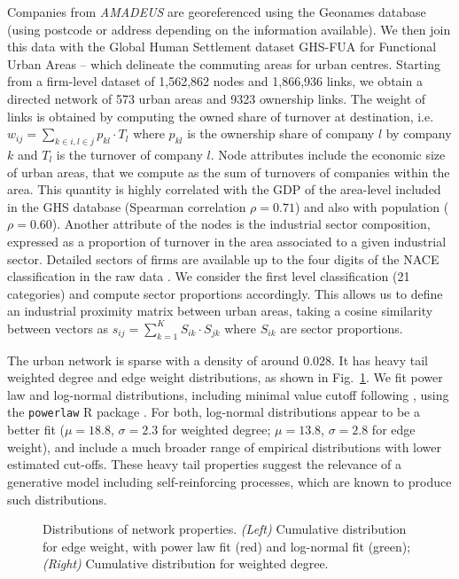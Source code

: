 \documentclass[10pt,letterpaper]{article}
\begin{document}
Companies from \emph{AMADEUS} are georeferenced using the Geonames database (using postcode or address depending on the information available). We then join this data with the Global Human Settlement dataset GHS-FUA for Functional Urban Areas \cite{Florczyk2019ghs} -- which delineate the commuting areas for urban centres. Starting from a firm-level dataset of 1,562,862 nodes and 1,866,936 links, we obtain a directed network of 573 urban areas and 9323 ownership links. The weight of links is obtained by computing the owned share of turnover at destination, i.e. $w_{ij} = \sum_{k \in i,l \in j} p_{kl} \cdot T_l$ where $p_{kl}$ is the ownership share of company $l$ by company $k$ and $T_l$ is the turnover of company $l$. Node attributes include the economic size of urban areas, that we compute as the sum of turnovers of companies within the area. This quantity is highly correlated with the GDP of the area-level included in the GHS database (Spearman correlation $\rho = 0.71$) and also with population ($\rho = 0.60$). Another attribute of the nodes is the industrial sector composition, expressed as a proportion of turnover in the area associated to a given industrial sector. Detailed sectors of firms are available up to the four digits of the NACE classification in the raw data \cite{EUROSTAT2008}. We consider the first level classification (21 categories) and compute sector proportions accordingly. This allows us to define an industrial proximity matrix between urban areas, taking a cosine similarity between vectors as $s_{ij} = \sum_{k=1}^{K} S_{ik}\cdot S_{jk}$ where $S_{ik}$ are sector proportions.

The urban network is sparse with a density of around $0.028$. It has heavy tail weighted degree and edge weight distributions, as shown in Fig.~\ref{fig:nwdist}. We fit power law and log-normal distributions, including minimal value cutoff following \cite{clauset2009power}, using the \texttt{powerlaw} R package \cite{powerlawpackage}. For both, log-normal distributions appear to be a better fit ($\mu=18.8$, $\sigma=2.3$ for weighted degree; $\mu=13.8$, $\sigma=2.8$ for edge weight), and include a much broader range of empirical distributions with lower estimated cut-offs. These heavy tail properties suggest the relevance of a generative model including self-reinforcing processes, which are known to produce such distributions.

\begin{figure}
    \begin{center}
    \end{center}
    \vspace{2cm}
    \caption{Distributions of network properties. \textit{(Left)} Cumulative distribution for edge weight, with power law fit (red) and log-normal fit (green); \textit{(Right)} Cumulative distribution for weighted degree.}
    \label{fig:nwdist}
\end{figure}
\end{document}
